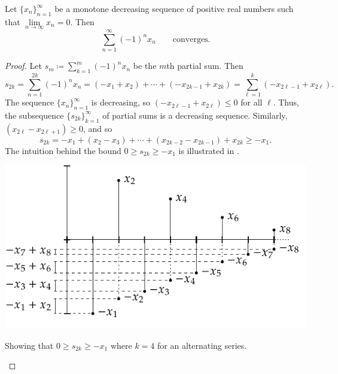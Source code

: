 \begin{prop}
Let $\{ x_n \}_{n=1}^\infty$ be a monotone decreasing sequence of positive real numbers such
that $\lim\limits_{n\to\infty} x_n = 0$.  Then
\begin{equation*}
\sum_{n=1}^\infty {(-1)}^n x_n \qquad \text{converges.}
\end{equation*}
\end{prop}

\begin{proof}
Let $s_m \coloneqq \sum_{k=1}^m {(-1)}^n x_n$ be the $m$th partial sum.  Then
\begin{equation*}
s_{2k} =
\sum_{n=1}^{2k} {(-1)}^n x_n
=
(-x_1 + x_2) + \cdots + (-x_{2k-1} + x_{2k})
=
\sum_{\ell=1}^{k} (-x_{2\ell-1} + x_{2\ell}) .
\end{equation*}
The sequence $\{ x_n \}_{n=1}^\infty$ is decreasing, so $(-x_{2\ell-1}+x_{2\ell}) \leq 0$
for all $\ell$.
Thus, the subsequence $\{ s_{2k} \}_{k=1}^\infty$ of partial sums
is a decreasing sequence.  Similarly, $(x_{2\ell}-x_{2\ell+1}) \geq 0$, and so
\begin{equation*}
s_{2k} = - x_1 + ( x_2 - x_3 ) + \cdots + ( x_{2k-2} - x_{2k-1} ) + x_{2k}
\geq -x_1 .
\end{equation*}
The intuition behind the bound
$0 \geq s_{2k} \geq -x_1$ is illustrated in .
\begin{myfigureht}
\includegraphics{figures/ser-alternate}
\caption{Showing that $0 \geq s_{2k} \geq -x_1$ where $k=4$ for an alternating series.\label{fig:seralternate}}
\end{myfigureht}


\end{proof}
